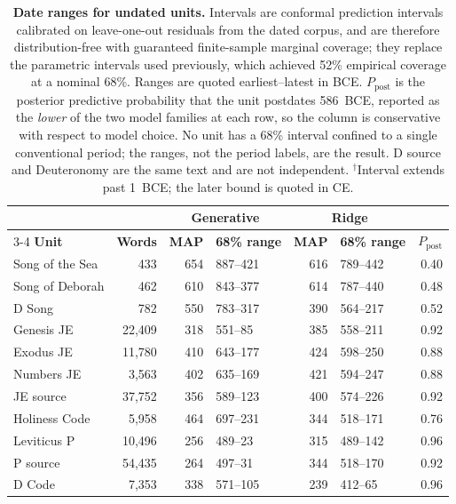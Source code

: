 \documentclass[10pt,letterpaper]{article}
\begin{document}
\begin{table}[!ht]
\centering
\caption{\textbf{Date ranges for undated units.}  Intervals are
conformal prediction intervals calibrated on leave-one-out residuals
from the dated corpus, and are therefore distribution-free with
guaranteed finite-sample marginal coverage; they replace the parametric
intervals used previously, which achieved 52\% empirical coverage at a
nominal 68\%.  Ranges are quoted earliest--latest in BCE.  $P_{\mathrm{post}}$
is the posterior predictive probability that the unit postdates 586~BCE,
reported as the \emph{lower} of the two model families at each row, so
the column is conservative with respect to model choice.
No unit has a 68\% interval confined to a single conventional period;
the ranges, not the period labels, are the result.  D source and
Deuteronomy are the same text and are not independent.
$^\dagger$Interval extends past 1~BCE; the later bound is quoted in CE.}
\begin{tabular}{lrrlrlr}
\hline
 & & \multicolumn{2}{c}{\textbf{Generative}} & \multicolumn{2}{c}{\textbf{Ridge}} & \\
\cline{3-4}\cline{5-6}
\textbf{Unit} & \textbf{Words} & \textbf{MAP} & \textbf{68\% range} & \textbf{MAP} & \textbf{68\% range} & \textbf{$P_{\mathrm{post}}$} \\
\hline
Song of the Sea     & 433 & 654 & 887--421 & 616 & 789--442 & 0.40 \\
Song of Deborah     & 462 & 610 & 843--377 & 614 & 787--440 & 0.48 \\
D Song              & 782 & 550 & 783--317 & 390 & 564--217 & 0.52 \\
Genesis JE          & 22{,}409 & 318 & 551--85 & 385 & 558--211 & 0.92 \\
Exodus JE           & 11{,}780 & 410 & 643--177 & 424 & 598--250 & 0.88 \\
Numbers JE          & 3{,}563 & 402 & 635--169 & 421 & 594--247 & 0.88 \\
JE source           & 37{,}752 & 356 & 589--123 & 400 & 574--226 & 0.92 \\
Holiness Code       & 5{,}958 & 464 & 697--231 & 344 & 518--171 & 0.76 \\
Leviticus P         & 10{,}496 & 256 & 489--23 & 315 & 489--142 & 0.96 \\
P source            & 54{,}435 & 264 & 497--31 & 344 & 518--170 & 0.92 \\
D Code              & 7{,}353 & 338 & 571--105 & 239 & 412--65 & 0.96 \\

\end{tabular}
\end{table}
\end{document}
